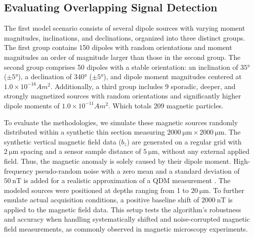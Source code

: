 \subsection{Evaluating Overlapping Signal Detection}

The first model scenario consists of several dipole sources with varying moment magnitudes, inclinations, and declinations, organized into three distinct groups. The first group contains 150 dipoles with random orientations and moment magnitudes an order of magnitude larger than those in the second group. The second group comprises 50 dipoles with a stable orientation: an inclination of \(\ang{35}\) (\(\pm \ang{5}\)), a declination of \(\ang{340}\) (\(\pm \ang{5}\)), and dipole moment magnitudes centered at \(1.0 \times 10^{-16} Am^2\). Additionally, a third group includes 9 sporadic, deeper, and strongly magnetized sources with random orientations and significantly higher dipole moments of \(1.0 \times 10^{-11} Am^2\). Which totals 209 magnetic particles.

To evaluate the methodologies, we simulate these magnetic sources randomly distributed within a synthetic thin section measuring \(\qty{2000}{\micro\meter} \times \qty{2000}{\micro\meter}\). The synthetic vertical magnetic field data (\(b_z\)) are generated on a regular grid with \(\qty{2}{\micro\meter}\) spacing and a sensor sample distance of \(\qty{5}{\micro\meter}\), without any external applied field. Thus, the magnetic anomaly is solely caused by their dipole moment. High-frequency pseudo-random noise with a zero mean and a standard deviation of \(\qty{50}{\nano\tesla}\) is added for a realistic approximation of a QDM measurement \citep{Glenn2017}. The modeled sources were positioned at depths ranging from 1 to \(\qty{20}{\micro\meter}\). To further emulate actual acquisition conditions, a positive baseline shift of \(\qty{2000}{\nano\tesla}\) is applied to the magnetic field data. This setup tests the algorithm's robustness and accuracy when handling systematically shifted and noise-corrupted magnetic field measurements, as commonly observed in magnetic microscopy experiments.

